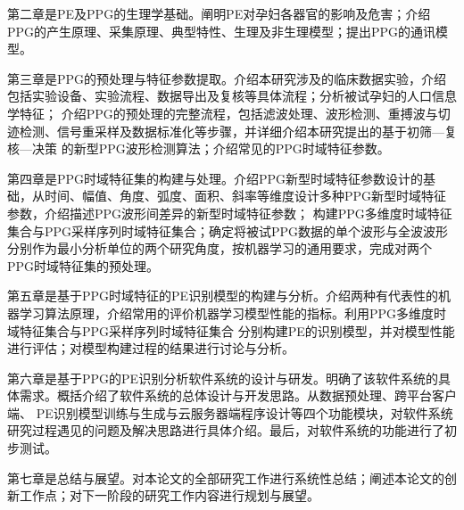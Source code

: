 第二章是PE及PPG的生理学基础。阐明PE对孕妇各器官的影响及危害；介绍PPG的产生原理、采集原理、典型特性、生理及非生理模型；提出PPG的通讯模型。

第三章是PPG的预处理与特征参数提取。介绍本研究涉及的临床数据实验，介绍包括实验设备、实验流程、数据导出及复核等具体流程；分析被试孕妇的人口信息学特征；
介绍PPG的预处理的完整流程，包括滤波处理、波形检测、重搏波与切迹检测、信号重采样及数据标准化等步骤，并详细介绍本研究提出的基于初筛—复核—决策
的新型PPG波形检测算法；介绍常见的PPG时域特征参数。

第四章是PPG时域特征集的构建与处理。介绍PPG新型时域特征参数设计的基础，从时间、幅值、角度、弧度、面积、斜率等维度设计多种PPG新型时域特征参数，介绍描述PPG波形间差异的新型时域特征参数；
构建PPG多维度时域特征集合与PPG采样序列时域特征集合；确定将被试PPG数据的单个波形与全波波形分别作为最小分析单位的两个研究角度，按机器学习的通用要求，完成对两个PPG时域特征集的预处理。

第五章是基于PPG时域特征的PE识别模型的构建与分析。介绍两种有代表性的机器学习算法原理，介绍常用的评价机器学习模型性能的指标。利用PPG多维度时域特征集合与PPG采样序列时域特征集合
分别构建PE的识别模型，并对模型性能进行评估；对模型构建过程的结果进行讨论与分析。

第六章是基于PPG的PE识别分析软件系统的设计与研发。明确了该软件系统的具体需求。概括介绍了软件系统的总体设计与开发思路。从数据预处理、跨平台客户端、
PE识别模型训练与生成与云服务器端程序设计等四个功能模块，对软件系统研究过程遇见的问题及解决思路进行具体介绍。最后，对软件系统的功能进行了初步测试。

第七章是总结与展望。对本论文的全部研究工作进行系统性总结；阐述本论文的创新工作点；对下一阶段的研究工作内容进行规划与展望。
